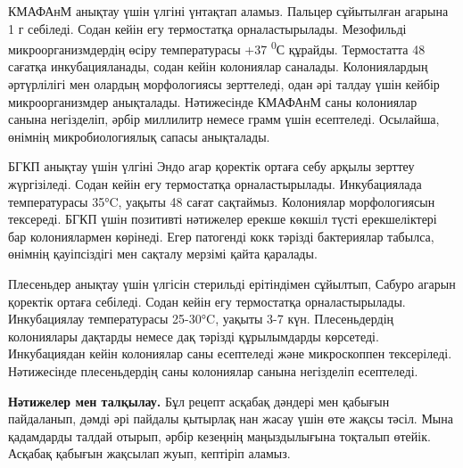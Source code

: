 \begin{multicols}{2}
КМАФАнМ анықтау үшін үлгіні үнтақтап аламыз. Пальцер сұйытылған агарына
1 г себіледі. Содан кейін егу термостатқа орналастырылады. Мезофильді
микроорганизмдердің өсіру температурасы +37 \textsuperscript{0}С
құрайды. Термостатта 48 сағатқа инкубацияланады, содан кейін колониялар
саналады. Колониялардың әртүрлілігі мен олардың морфологиясы зерттеледі,
одан әрі талдау үшін кейбір микроорганизмдер анықталады. Нәтижесінде
КМАФАнМ саны колониялар санына негізделіп, әрбір миллилитр немесе грамм
үшін есептеледі. Осылайша, өнімнің микробиологиялық сапасы анықталады.

БГКП анықтау үшін үлгіні Эндо агар қоректік ортаға себу арқылы зерттеу
жүргізіледі. Содан кейін егу термостатқа орналастырылады. Инкубациялада
температурасы 35°C, уақыты 48 сағат сақтаймыз. Колониялар морфологиясын
тексереді. БГКП үшін позитивті нәтижелер ерекше көкшіл түсті
ерекшеліктері бар колониялармен көрінеді. Егер патогенді кокк тәрізді
бактериялар табылса, өнімнің қауіпсіздігі мен сақталу мерзімі қайта
қаралады.

Плесеньдер анықтау үшін үлгісін стерильді ерітіндімен сұйылтып, Сабуро
агарын қоректік ортаға себіледі. Содан кейін егу термостатқа
орналастырылады. Инкубациялау температурасы 25-30°C, уақыты 3-7 күн.
Плесеньдердің колониялары дақтарды немесе дақ тәрізді құрылымдарды
көрсетеді. Инкубациядан кейін колониялар саны есептеледі және
микроскоппен тексеріледі. Нәтижесінде плесеньдердің саны колониялар
санына негізделіп есептеледі.

{\bfseries Нәтижелер мен талқылау.} Бұл рецепт асқабақ дәндері мен қабығын
пайдаланып, дәмді әрі пайдалы қытырлақ нан жасау үшін өте жақсы тәсіл.
Мына қадамдарды талдай отырып, әрбір кезеңнің маңыздылығына тоқталып
өтейік. Асқабақ қабығын жақсылап жуып, кептіріп аламыз.


\end{multicols}
